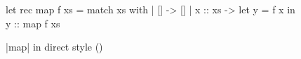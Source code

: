 \begin{figure}[tp]
\begin{OCaml}
let rec map f xs =
  match xs with
  | [] ->
      []
  | x :: xs ->
      let y = f x in
      y :: map f xs
\end{OCaml}
\caption{\ocaml|map| in direct style (\OCamlLang)}
\label{fig:map}
\end{figure}